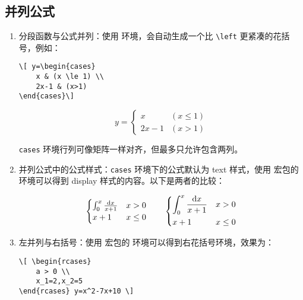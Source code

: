 \subsection{并列公式}
\begin{enumerate}

\item 分段函数与公式并列：使用  环境，会自动生成一个比 \verb|\left| 更紧凑的花括号，例如：

\begin{tcolorbox}[sidebyside]
\begin{lstlisting}
\[ y=\begin{cases}
    x & (x \le 1) \\ 
    2x-1 & (x>1) 
\end{cases}\]
\end{lstlisting} 

\tcblower

$$ y=\begin{cases}x & (x\le1) \\ 2x-1 & (x>1) \end{cases} $$
\end{tcolorbox}

\verb|cases| 环境行列可像矩阵一样对齐，但最多只允许包含两列。

\item 并列公式中的公式样式：\verb|cases| 环境下的公式默认为 text 样式，使用  宏包的  环境可以得到 display 样式的内容。以下是两者的比较：

\begin{tcolorbox}[colback=white]
\[ \begin{cases}
    \int_0^x \frac{\mathop{}\negthinspace\mathrm{d}{}x}{x+1} & x > 0 \\
    x + 1 & x \leq 0
\end{cases} \qquad \begin{dcases}
    \int_0^x \frac{\mathop{}\negthinspace\mathrm{d}{}x}{x+1} & x > 0 \\
    x + 1 & x \leq 0
\end{dcases} \]
\end{tcolorbox}

\item 左并列与右括号：使用  宏包的  环境可以得到右花括号环境，效果为：

\begin{tcolorbox}[sidebyside]
\begin{lstlisting}
\[ \begin{rcases}
    a > 0 \\
    x_1=2,x_2=5
\end{rcases} y=x^2-7x+10 \]
\end{lstlisting} 


\end{tcolorbox}
\end{enumerate}
